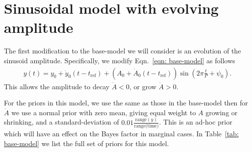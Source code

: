 \documentclass{article}
\newcommand{\tref}{t_{\textrm{ref}}}
\begin{document}
\section{Sinusoidal model with evolving amplitude}

The first modification to the base-model we will consider is an evolution of
the sinusoid amplitude.
Specifically, we modify Eqn.~\eqref{eqn: base-model} as follows
\begin{align}
y(t) = y_0 + \dot{y}_0(t - \tref) +
(A_0 + \dot{A}_0(t-\tref)) \sin\left(2\pi \frac{t}{P} + \psi_0\right).
\label{eqn: decay amplitude}
\end{align}
This allows the amplitude to decay $\dot{A} < 0$, or grow $\dot{A} > 0$.

For the priors in this model, we use the same as those in the base-model then
for $\dot{A}$ we use a normal prior with zero mean, giving equal weight to $A$
growing or shrinking, and a standard-deviation of
$0.01\frac{\textrm{range}(y)}{\textrm{range(time)}}$. This is an ad-hoc prior
which will have an effect on the Bayes factor in marginal cases. In Table~\ref{tab: base-model} we list the full set of priors for this model.
%
\end{document}
